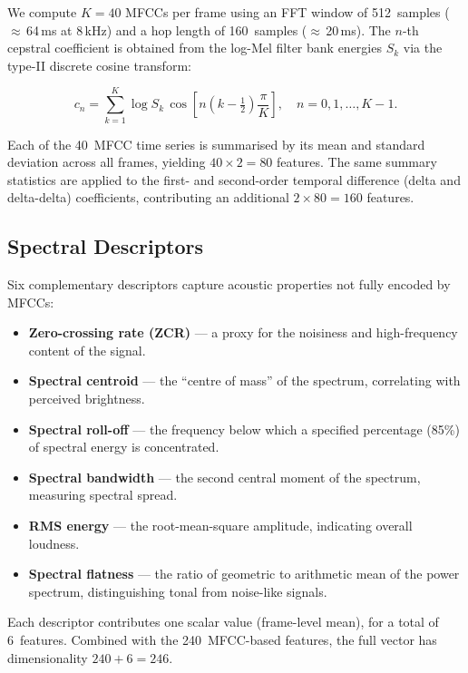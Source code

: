 \documentclass[conference]{IEEEtran}
\begin{document}
We compute $K = 40$ MFCCs per frame using an FFT window of 512~samples
($\approx$\,64\,ms at 8\,kHz) and a hop length of 160~samples
($\approx$\,20\,ms).  The $n$-th cepstral coefficient is obtained from
the log-Mel filter bank energies $S_k$ via the type-II discrete cosine
transform:

\begin{equation}
  c_n = \sum_{k=1}^{K} \log S_k \,
        \cos\!\left[n\!\left(k - \tfrac{1}{2}\right)\frac{\pi}{K}\right],
        \quad n = 0, 1, \dots, K{-}1.
  \label{eq:mfcc}
\end{equation}

\noindent
Each of the 40~MFCC time series is summarised by its mean and standard
deviation across all frames, yielding $40 \times 2 = 80$ features.  The
same summary statistics are applied to the first- and second-order
temporal difference (delta and delta-delta) coefficients, contributing
an additional $2 \times 80 = 160$ features.

\subsection{Spectral Descriptors}

Six complementary descriptors capture acoustic properties not fully
encoded by MFCCs:

\begin{itemize}
  \item \textbf{Zero-crossing rate (ZCR)} --- a proxy for the
        noisiness and high-frequency content of the signal.
  \item \textbf{Spectral centroid} --- the ``centre of mass'' of the
        spectrum, correlating with perceived brightness.
  \item \textbf{Spectral roll-off} --- the frequency below which a
        specified percentage (85\%) of spectral energy is concentrated.
  \item \textbf{Spectral bandwidth} --- the second central moment of
        the spectrum, measuring spectral spread.
  \item \textbf{RMS energy} --- the root-mean-square amplitude,
        indicating overall loudness.
  \item \textbf{Spectral flatness} --- the ratio of geometric to
        arithmetic mean of the power spectrum, distinguishing tonal from
        noise-like signals.
\end{itemize}

\noindent
Each descriptor contributes one scalar value (frame-level mean), for a
total of 6~features.  Combined with the 240~MFCC-based features, the
full vector has dimensionality $240 + 6 = 246$.
\end{document}
